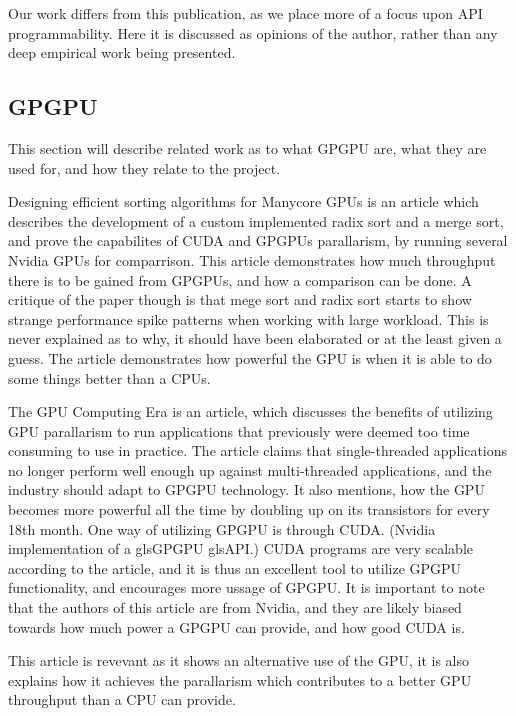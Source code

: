 Our work differs from this publication, as we place more of a focus upon \gls{API} programmability.
Here it is discussed as opinions of the author, rather than any deep empirical work being presented.

\subsection{\gls{GPGPU}}
This section will describe related work as to what GP\gls{GPU} are, what they are used for, and how they relate to the project.

Designing efficient sorting algorithms for Manycore \glspl{GPU} \cite{satish_2009_designing} is an article which describes the development of a custom implemented radix sort and a merge sort, and prove the capabilites of CUDA and \glspl{GPGPU} parallarism, by running several Nvidia \glspl{GPU} for comparrison. 
This article demonstrates how much throughput there is to be gained from \glspl{GPGPU}, and how a comparison can be done. 
A critique of the paper though is that mege sort and radix sort starts to show strange performance spike patterns when working with large workload. 
This is never explained as to why, it should have been elaborated or at the least given a guess.
The article demonstrates how powerful the \gls{GPU} is when it is able to do some things better than a \glspl{CPU}.

The GPU Computing Era \cite{gpu_computing_era} is an article, which discusses the benefits of utilizing \gls{GPU} parallarism to run applications that previously were deemed too time consuming to use in practice. 
The article claims that single-threaded applications no longer perform well enough up against multi-threaded applications, and the industry should adapt to GP\gls{GPU} technology. 
It also mentions, how the \gls{GPU} becomes more powerful all the time by doubling up on its transistors for every 18th month. 
One way of utilizing \gls{GPGPU} is through CUDA. (Nvidia implementation of a gls{GPGPU} gls{API}.)
CUDA programs are very scalable according to the article, and it is thus an excellent tool to utilize \gls{GPGPU} functionality, and encourages more ussage of \gls{GPGPU}.
It is important to note that the authors of this article are from Nvidia, and they are likely biased towards how much power a \gls{GPGPU} can provide, and how good CUDA is. 

This article is revevant as it shows an alternative use of the \gls{GPU}, it is also explains how it achieves the parallarism which contributes to a better \gls{GPU} throughput than a \gls{CPU} can provide.

